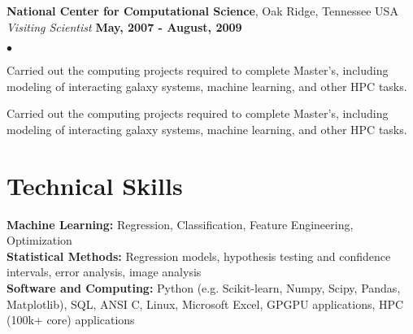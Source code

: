 \documentclass[margin,line, 11pt]{res}
\newenvironment{list2}{
  \begin{list}{$\bullet$}{%
      \setlength{\itemsep}{0in}
      \setlength{\parsep}{0in} \setlength{\parskip}{0in}
      \setlength{\topsep}{0in} \setlength{\partopsep}{0in} 
      \setlength{\leftmargin}{0.2in}}}{\end{list}}
\begin{document}
\begin{resume}
\textbf{National Center for Computational Science}, Oak Ridge, Tennessee USA\\
\textit{Visiting Scientist} \hfill \textbf{May, 2007 - August, 2009}\\
    \begin{list2}
    	\vspace*{-5mm}
    	\item Carried out the computing projects required to complete Master's, including modeling of interacting galaxy systems, machine learning, and other HPC tasks.
    	\item Carried out the computing projects required to complete Master's, including modeling of interacting galaxy systems, machine learning, and other HPC tasks.
    \end{list2}

\section{Technical Skills}
\textbf{Machine Learning:} Regression, Classification, Feature Engineering, Optimization\\
\textbf{Statistical Methods:} Regression models, hypothesis testing and confidence intervals, error analysis, image analysis\\
\textbf{Software and Computing:}  Python (e.g. Scikit-learn, Numpy, Scipy, Pandas, Matplotlib), SQL, ANSI C, Linux, Microsoft Excel, GPGPU applications, HPC (100k+ core) applications\\
\vspace*{-5mm}

\end{resume}
\end{document}
